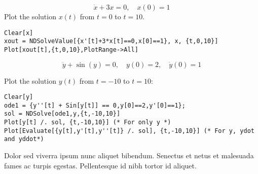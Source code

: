 \documentclass[8pt]{innovativeinnovation-cheatsheet}
\begin{document}
\begin{multicols*}{3}
\begin{equation}
    \dot x + 3x = 0,\quad x(0) = 1
\end{equation}
Plot the solution $x(t)$ from $t=0$ to $t=10$.
\begin{lstlisting}
Clear[x]
xout = NDSolveValue[{x'[t]+3*x[t]==0,x[0]==1}, x, {t,0,10}]
Plot[xout[t],{t,0,10},PlotRange->All]
\end{lstlisting}

\begin{equation}
    \ddot y + \sin(y) = 0,\quad y(0) = 2,\quad \dot y(0) = 1
\end{equation}

Plot the solution $y(t)$ from $t=-10$ to $t=10$:

\begin{lstlisting}
Clear[y]
ode1 = {y''[t] + Sin[y[t]] == 0,y[0]==2,y'[0]==1};
sol = NDSolve[ode1,y,{t,-10,10}]
Plot[y[t] /. sol, {t,-10,10}] (* For only y *)
Plot[Evaluate[{y[t],y'[t],y''[t]} /. sol], {t,-10,10}] (* For y, ydot and yddot*)
\end{lstlisting}


Dolor sed viverra ipsum nunc aliquet bibendum. Senectus et netus et malesuada
fames ac turpis egestas. Pellentesque id nibh tortor id aliquet.

\vfill


\end{multicols*}
\end{document}
